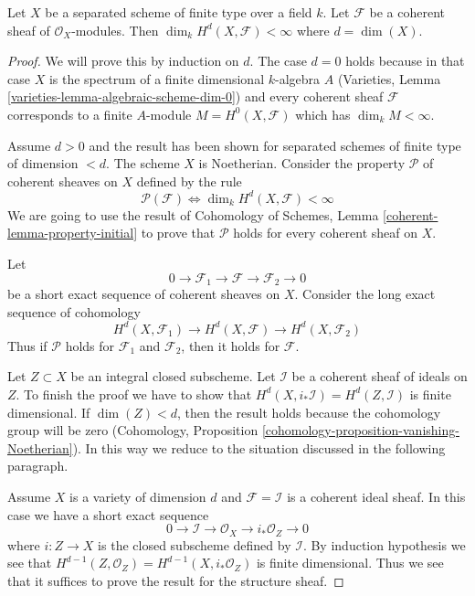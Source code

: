 \begin{lemma}
\label{lemma-top-cohomology-coherent}
Let $X$ be a separated scheme of finite type over a field $k$.
Let $\mathcal{F}$ be a coherent sheaf of $\mathcal{O}_X$-modules.
Then $\dim_k H^d(X, \mathcal{F}) < \infty$ where $d = \dim(X)$.
\end{lemma}

\begin{proof}
We will prove this by induction on $d$. The case $d = 0$ holds because
in that case $X$ is the spectrum of a finite dimensional $k$-algebra $A$
(Varieties, Lemma \ref{varieties-lemma-algebraic-scheme-dim-0})
and every coherent sheaf $\mathcal{F}$ corresponds to a finite $A$-module
$M = H^0(X, \mathcal{F})$ which has $\dim_k M < \infty$.

\medskip\noindent
Assume $d > 0$ and the result has been shown for separated schemes
of finite type of dimension $< d$. The scheme $X$ is Noetherian. Consider
the property $\mathcal{P}$ of coherent sheaves on $X$ defined by the rule
$$
\mathcal{P}(\mathcal{F}) \Leftrightarrow
\dim_k H^d(X, \mathcal{F}) < \infty
$$
We are going to use the result of
Cohomology of Schemes, Lemma \ref{coherent-lemma-property-initial}
to prove that $\mathcal{P}$ holds for every coherent sheaf on $X$.

\medskip\noindent
Let
$$
0 \to \mathcal{F}_1 \to \mathcal{F} \to \mathcal{F}_2 \to 0
$$
be a short exact sequence of coherent sheaves on $X$.
Consider the long exact sequence of cohomology
$$
H^d(X, \mathcal{F}_1) \to
H^d(X, \mathcal{F}) \to
H^d(X, \mathcal{F}_2)
$$
Thus if $\mathcal{P}$ holds for $\mathcal{F}_1$ and $\mathcal{F}_2$,
then it holds for $\mathcal{F}$.

\medskip\noindent
Let $Z \subset X$ be an integral closed subscheme. Let $\mathcal{I}$
be a coherent sheaf of ideals on $Z$. To finish the proof we have to show
that $H^d(X, i_*\mathcal{I}) = H^d(Z, \mathcal{I})$ is finite dimensional.
If $\dim(Z) < d$, then the result holds because the cohomology group
will be zero (Cohomology, Proposition
\ref{cohomology-proposition-vanishing-Noetherian}).
In this way we reduce to the situation discussed in the following paragraph.

\medskip\noindent
Assume $X$ is a variety of dimension $d$ and 
$\mathcal{F} = \mathcal{I}$ is a coherent ideal sheaf. In this
case we have a short exact sequence
$$
0 \to \mathcal{I} \to \mathcal{O}_X \to i_*\mathcal{O}_Z \to 0
$$
where $i : Z \to X$ is the closed subscheme defined by $\mathcal{I}$.
By induction hypothesis we see that
$H^{d - 1}(Z, \mathcal{O}_Z) = H^{d - 1}(X, i_*\mathcal{O}_Z)$ is
finite dimensional. Thus we see that it suffices to prove the result
for the structure sheaf.


\end{proof}
